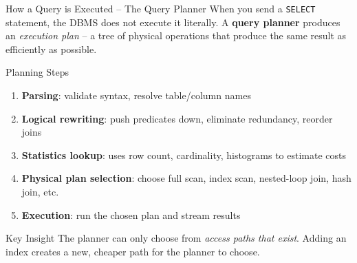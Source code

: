 \begin{frame}{How a Query is Executed -- The Query Planner}
  When you send a \texttt{SELECT} statement, the DBMS does not execute it
  literally. A \textbf{query planner} produces an \emph{execution plan} --
  a tree of physical operations that produce the same result as efficiently
  as possible.

  \begin{block}{Planning Steps}
    \begin{enumerate}
      \item \textbf{Parsing}: validate syntax, resolve table/column names
      \item \textbf{Logical rewriting}: push predicates down, eliminate
            redundancy, reorder joins
      \item \textbf{Statistics lookup}: uses row count, cardinality,
            histograms to estimate costs
      \item \textbf{Physical plan selection}: choose full scan, index scan,
            nested-loop join, hash join, etc.
      \item \textbf{Execution}: run the chosen plan and stream results
    \end{enumerate}
  \end{block}

  \begin{examples}{Key Insight}
    The planner can only choose from \emph{access paths that exist}.
    Adding an index creates a new, cheaper path for the planner to choose.
  \end{examples}
\end{frame}

